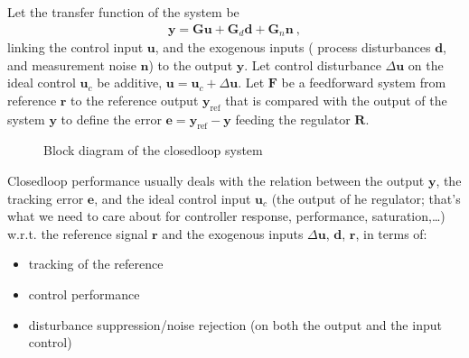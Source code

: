 \documentclass[letterpaper,10pt,english]{jupyterBook}
\begin{document}
\sphinxAtStartPar
Let the transfer function of the system be
\begin{equation*}
\begin{split}\mathbf{y} = \mathbf{G} \mathbf{u} + \mathbf{G}_d \mathbf{d} + \mathbf{G}_n \mathbf{n} \ ,\end{split}
\end{equation*}
\sphinxAtStartPar
linking the control input \(\mathbf{u}\), and the exogenous inputs ( process disturbances \(\mathbf{d}\), and measurement noise \(\mathbf{n}\)) to the output \(\mathbf{y}\). Let control disturbance \(\Delta \mathbf{u}\) on the ideal control \(\mathbf{u}_c\) be additive, \(\mathbf{u} = \mathbf{u}_c + \Delta \mathbf{u}\). Let \(\mathbf{F}\) be a feed\sphinxhyphen{}forward system from reference \(\mathbf{r}\) to the reference output \(\mathbf{y}_{\text{ref}}\) that is compared with the output of the system \(\mathbf{y}\) to define the error \(\mathbf{e} = \mathbf{y}_{\text{ref}} - \mathbf{y}\) feeding the regulator \(\mathbf{R}\).

\begin{figure}[htbp]
\centering
\capstart

\noindent{}
\caption{Block diagram of the closed\sphinxhyphen{}loop system}\label{\detokenize{ch/control/closed-loop-requirements-performance:fig-closed-loop-tfs}}\end{figure}

\sphinxAtStartPar
Closed\sphinxhyphen{}loop performance usually deals with the relation between the output \(\mathbf{y}\), the tracking error \(\mathbf{e}\), and the ideal control input \(\mathbf{u}_c\) (the output of he regulator; that’s what we need to care about for controller response, performance, saturation,…) w.r.t. the reference signal \(\mathbf{r}\) and the exogenous inputs \(\Delta \mathbf{u}\), \(\mathbf{d}\), \(\mathbf{r}\), in terms of:
\begin{itemize}
\item {} 
\sphinxAtStartPar
tracking of the reference

\item {} 
\sphinxAtStartPar
control performance

\item {} 
\sphinxAtStartPar
disturbance suppression/noise rejection (on both the output and the input control)

\end{itemize}
\end{document}
